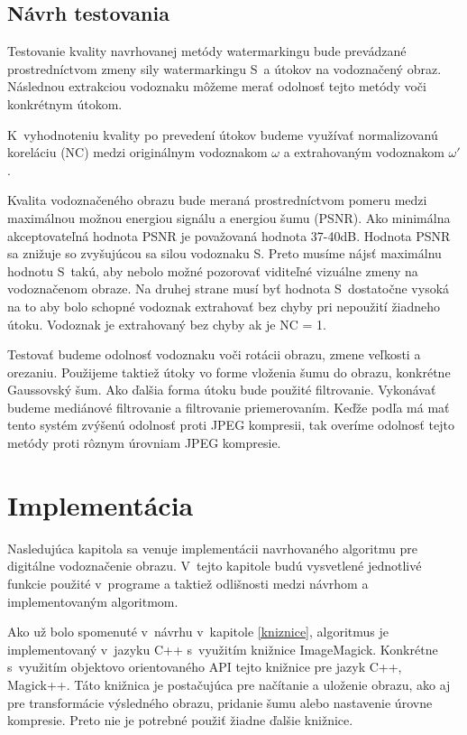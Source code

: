 \section{Návrh testovania}
Testovanie kvality navrhovanej metódy watermarkingu bude prevádzané prostredníctvom zmeny sily watermarkingu S~a útokov na vodoznačený obraz. Následnou extrakciou vodoznaku môžeme merať odolnosť tejto metódy voči konkrétnym útokom.

K~vyhodnoteniu kvality po prevedení útokov budeme využívať normalizovanú koreláciu (NC) medzi originálnym vodoznakom $\omega$ a extrahovaným vodoznakom $\omega'$.

Kvalita vodoznačeného obrazu bude meraná prostredníctvom pomeru medzi maximálnou možnou energiou signálu a energiou šumu (PSNR). Ako minimálna akceptovateľná hodnota PSNR je považovaná hodnota 37-40dB. Hodnota PSNR sa znižuje so zvyšujúcou sa silou vodoznaku S. Preto musíme nájsť maximálnu hodnotu S~takú, aby nebolo možné pozorovať viditeľné vizuálne zmeny na vodoznačenom obraze. Na druhej strane musí byť hodnota S~dostatočne vysoká na to aby bolo schopné vodoznak extrahovať bez chyby pri nepoužití žiadneho útoku. Vodoznak je extrahovaný bez chyby ak je NC = 1.

Testovať budeme odolnosť vodoznaku voči rotácii obrazu, zmene veľkosti a orezaniu. Použijeme taktiež útoky vo forme vloženia šumu do obrazu, konkrétne Gaussovský šum. Ako ďalšia forma útoku bude použité filtrovanie. Vykonávať budeme mediánové filtrovanie a filtrovanie priemerovaním. Keďže podľa \cite{QRdecomposition} má mať tento systém zvýšenú odolnosť proti JPEG kompresii, tak overíme odolnosť tejto metódy proti rôznym úrovniam JPEG kompresie.

\chapter{Implementácia}
\label{ch-impl}
Nasledujúca kapitola sa venuje implementácii navrhovaného algoritmu pre digitálne vodoznačenie obrazu. V~tejto kapitole budú vysvetlené jednotlivé funkcie použité v~programe a taktiež odlišnosti medzi návrhom a implementovaným algoritmom.

Ako už bolo spomenuté v~návrhu v~kapitole \ref{kniznice}, algoritmus je implementovaný v~jazyku C++ s~využitím knižnice ImageMagick. Konkrétne s~využitím objektovo orientovaného API tejto knižnice pre jazyk C++, Magick++. Táto knižnica je postačujúca pre načítanie a uloženie obrazu, ako aj pre transformácie výsledného obrazu, pridanie šumu alebo nastavenie úrovne kompresie. Preto nie je potrebné použiť žiadne ďalšie knižnice.

